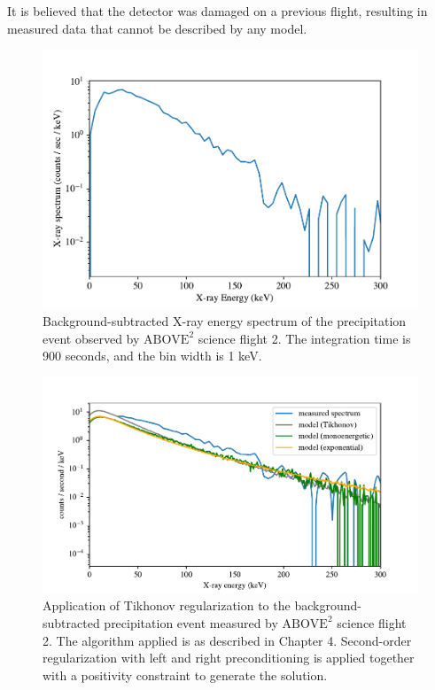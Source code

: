 It is believed that the detector was damaged on a previous flight, resulting in measured data that cannot be described by any model. 

\begin{figure}[p]
    \centering
    \includegraphics[width=1.0\textwidth]{figures/chapter_5/abv2_hist/abv2_hist}
    \caption{Background-subtracted X-ray energy spectrum of the precipitation event observed by $\text{ABOVE}^2$ science flight 2. The integration time is 900 seconds, and the bin width is 1 keV.}
    \label{abv2_hist}
\end{figure}

\begin{figure}[p]
    \centering
    \includegraphics[width=1.0\textwidth]{figures/chapter_5/abv2_tk_inv/abv2_fit_problem_4}
    \caption{Application of Tikhonov regularization to the background-subtracted precipitation event measured by $\text{ABOVE}^2$ science flight 2. The algorithm applied is as described in Chapter 4. Second-order regularization with left and right preconditioning is applied together with a positivity constraint to generate the solution.}
    \label{abv2_tk_inv}
\end{figure}

